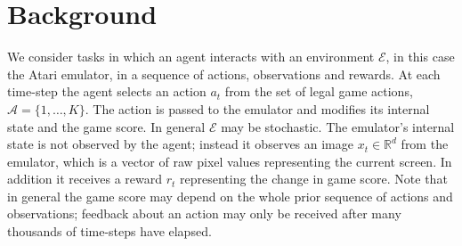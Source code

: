\documentclass{article} %
\begin{document}
% 




\section{Background}
\label{sec:background}

We consider tasks in which an agent interacts with an environment $\mathcal{E}$, in this case the Atari emulator, in a sequence of actions, observations and rewards. 
At each time-step the agent selects an action $a_t$ from the set of legal game actions, $\mathcal{A}=\{1, \ldots, K \}$. The action is passed to the emulator and modifies its internal state and the game score. In general $\mathcal{E}$ may be stochastic. The emulator's internal state is not observed by the agent; instead it observes an image $x_t \in \mathbb{R}^d$ from the emulator, which is a vector of raw pixel values representing the current screen. In addition it receives a reward $r_t$ representing the change in game score. Note that in general the game score may depend on the whole prior sequence of actions and observations; feedback about an action may only be received after many thousands of time-steps have elapsed. 
\end{document}
